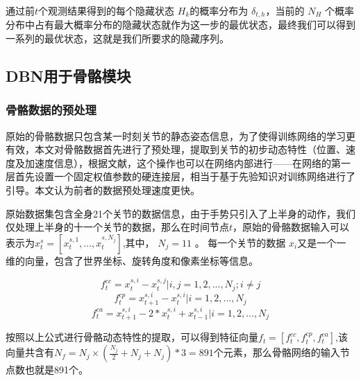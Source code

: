 \documentclass[a4paper, 12pt]{article}
\begin{document}
通过前$t$个观测结果得到的每个隐藏状态 $H_k$的概率分布为 $\delta_{t,h}$，当前的 $N_H$ 个概率分布中占有最大概率分布的隐藏状态就作为这一步的最优状态，最终我们可以得到一系列的最优状态，这就是我们所要求的隐藏序列。

\subsection{DBN用于骨骼模块}
\subsubsection{骨骼数据的预处理}
原始的骨骼数据只包含某一时刻关节的静态姿态信息，为了使得训练网络的学习更有效，本文对骨骼数据首先进行了预处理，提取到关节的初步动态特性（位置、速度及加速度信息），根据文献\cite{p2}，这个操作也可以在网络内部进行——在网络的第一层首先设置一个固定权值参数的硬连接层，相当于基于先验知识对训练网络进行了引导。本文认为前者的数据预处理速度更快。

原始数据集包含全身21个关节的数据信息，由于手势只引入了上半身的动作，我们仅处理上半身的十一个关节的数据，那么在时间节点$t$，原始的骨骼数据输入可以表示为$x_t^s=[x_t^{s,1},...,x_t^{s,N_j}]$,其中， $N_j=11$ 。
每一个关节的数据 $x_i$又是一个一维的向量，包含了世界坐标、旋转角度和像素坐标等信息。

\begin{equation}
  f_t^{cc}=x_t^{s,i}-x_t^{s,j}|i,j = 1,2,...,N_j;i\neq j
\end{equation}
\begin{equation}
  f_t^{cp}=x_{t+1}^{s,i}-x_t^{s,i}|i = 1,2,...,N_j
\end{equation}
\begin{equation}
  f_t^{ca}=x_{t+1}^{s,i}-2*x_t^{s,i}+x_{t-1}^{s,i}|i = 1,2,...,N_j
\end{equation}

按照以上公式进行骨骼动态特性的提取，可以得到特征向量$f_t=[f_t^{cc}, f_t^{cp}, f_t^{ca}]$,该向量共含有$N_f = N_j \times (\frac{N_j}{2}+N_j +N_j)*3=891$个元素，那么骨骼网络的输入节点数也就是891个。
\end{document}
